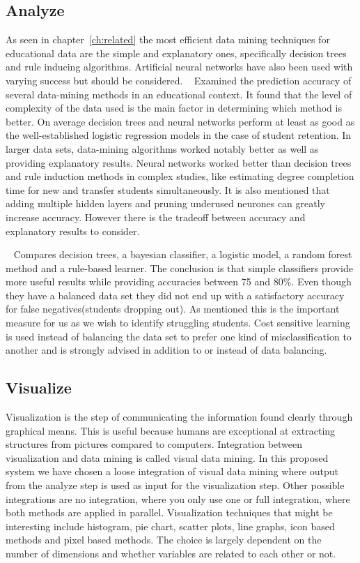 \subsection{Analyze}
As seen in chapter~\ref{ch:related} the most efficient data mining techniques for educational data are the simple and explanatory ones,
specifically decision trees and rule inducing algorithms.
Artificial neural networks have also been used with varying success but should be considered.
~\cite{2} Examined the prediction accuracy of several data-mining methods in an educational context.
It found that the level of complexity of the data used is the main factor in determining which method is better.
On average decision trees and neural networks perform at least as good as the well-established logistic regression models in the case of student retention.
In larger data sets, data-mining algorithms worked notably better as well as providing explanatory results. 
Neural networks worked better than decision trees and rule induction methods in complex studies, like estimating degree completion time for new and transfer students simultaneously. 
It is also mentioned that adding multiple hidden layers and pruning underused neurones can greatly increase accuracy. 
However there is the tradeoff between accuracy and explanatory results to consider. 

\bigskip\noindent
~\cite{7} Compares decision trees, a bayesian classifier, a logistic model, a random forest method and a rule-based learner.
The conclusion is that simple classifiers provide more useful results while providing accuracies between 75 and 80\%.
Even though they have a balanced data set they did not end up with a satisfactory accuracy for  false negatives(students dropping out). As mentioned this is the important measure for us as we wish to identify struggling students. Cost sensitive learning is used instead of balancing the data set to prefer one kind of misclassification to another and is strongly advised in addition to or instead of data balancing.  

\subsection{Visualize}	
Visualization is the step of communicating the information found clearly through graphical means. 
This is useful because humans are exceptional at extracting structures from pictures compared to computers. 
Integration between visualization and data mining is called visual data mining.
In this proposed system we have chosen a loose integration of visual data mining where output from the analyze step is used as input for the visualization step.
Other possible integrations are no integration, where you only use one or full integration, where both methods are applied in parallel.
Visualization techniques that might be interesting include histogram, pie chart, scatter plots, line graphs, icon based methods and pixel based methods.
The choice is largely dependent on the number of dimensions and whether variables are related to each other or not.

